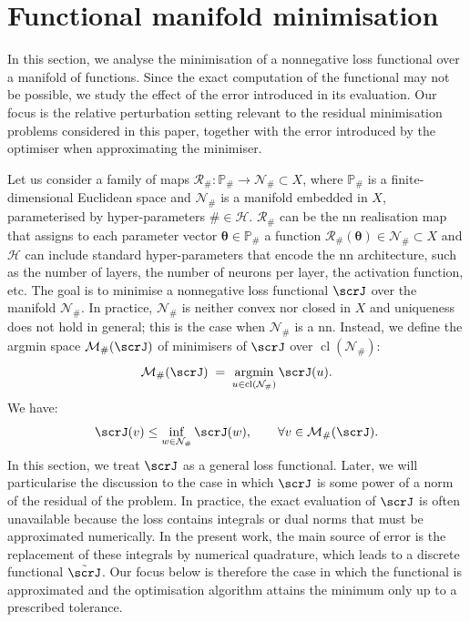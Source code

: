 \documentclass[oneside,reqno,11pt,a4paper]{amsart}
\theoremstyle{definition}
\DeclareMathOperator*{\argmin}{\arg\!\min}
\begin{document}
\section{Functional manifold minimisation} \label{sec:manifold-approximation}

In this section, we analyse the minimisation of a nonnegative loss functional
over a manifold of functions. Since the exact computation of the functional may
not be possible, we study the effect of the error introduced in its
evaluation. Our focus is the relative perturbation setting relevant to the
residual minimisation problems considered in this paper, together with the
error introduced by the optimiser when approximating the minimiser.

Let us consider a family of maps $\mathcal{R}_{\#}: \mathbb{P}_{\#} \rightarrow
\mathcal{N}_{\#} \subset X$, where $\mathbb{P}_{\#}$ is a finite-dimensional
Euclidean space and $\mathcal{N}_{\#}$ is a manifold embedded in $X$,
parameterised by hyper-parameters $\# \in \mathcal{H}$. $\mathcal{R}_{\#}$ can
be the \ac{nn} realisation map that assigns to each parameter vector
$\pmb{\theta} \in \mathbb{P}_{\#}$ a function $\mathcal{R}_{\#}(\pmb{\theta})
\in \mathcal{N}_{\#} \subset X$ and $\mathcal{H}$ can include standard
hyper-parameters that encode the \ac{nn} architecture, such as the
number of layers, the number of neurons per layer, the activation function,
etc. The goal is to minimise a nonnegative loss functional $\scrJ$ over the
manifold $\mathcal{N}_{\#}$. In practice, $\mathcal{N}_{\#}$ is neither convex
nor closed in $X$ and uniqueness does not hold in general; this is the case
when $\mathcal{N}_{\#}$ is a \ac{nn}. Instead, we define the argmin
space $\mathcal{M}_{\#}(\scrJ)$ of minimisers of $\scrJ$ over
$\operatorname{cl}(\mathcal{N}_{\#})$:  
\[
  \mathcal{M}_{\#}(\scrJ) \;=\; \argmin_{u\in\operatorname{cl}(\mathcal{N}_{\#})} \scrJ(u).
\]
We have:
\begin{equation}\label{eq:best-approx-error}
  \scrJ(v) \leq \inf_{w \in \mathcal{N}_{\#}} \scrJ(w),
  \qquad \forall v \in \mathcal{M}_{\#}(\scrJ).
\end{equation}
In this section, we treat $\scrJ$ as a general loss functional. Later, we will
particularise the discussion to the case in which $\scrJ$ is some power of a
norm of the residual of the problem. In practice, the exact
evaluation of $\scrJ$ is often unavailable because the loss contains integrals
or dual norms that must be approximated numerically. In the present work, the
main source of error is the replacement of these integrals by numerical
quadrature, which leads to a discrete functional $\tilde{\scrJ}$. Our focus
below is therefore the case in which the functional is approximated and the
optimisation algorithm attains the minimum only up to a prescribed
tolerance.
\end{document}
